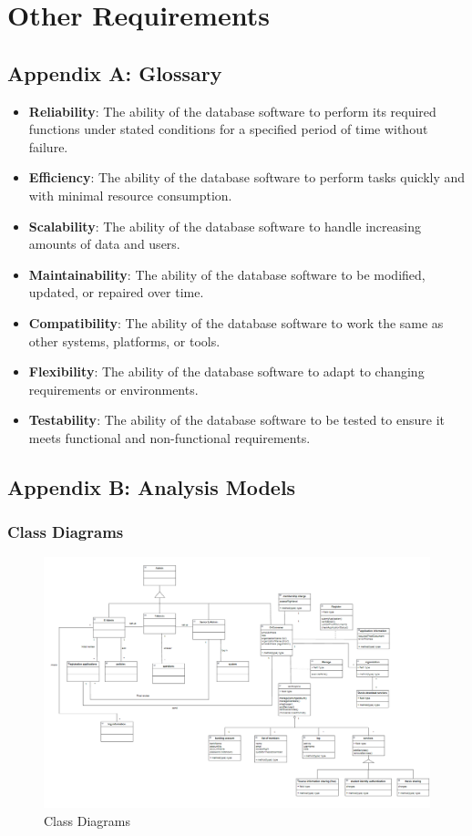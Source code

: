 \chapter{Other Requirements}

\section{Appendix A: Glossary}
\begin{itemize}
    \item \textbf{Reliability}: The ability of the database software to perform its required functions under stated conditions for a specified period of time without failure.
    
    \item \textbf{Efficiency}: The ability of the database software to perform tasks quickly and with minimal resource consumption.
    
    \item \textbf{Scalability}: The ability of the database software to handle increasing amounts of data and users.
    
    \item \textbf{Maintainability}: The ability of the database software to be modified, updated, or repaired over time.
    
    \item \textbf{Compatibility}: The ability of the database software to work the same as other systems, platforms, or tools.
    
    \item \textbf{Flexibility}: The ability of the database software to adapt to changing requirements or environments.
    
    \item \textbf{Testability}: The ability of the database software to be tested to ensure it meets functional and non-functional requirements.
\end{itemize}

\section{Appendix B: Analysis Models}
\subsection{Class Diagrams}
\begin{figure}[H]
    \centering
    \includegraphics[width=0.75\linewidth]{picture/20250318214541.png}
    \caption{Class Diagrams}
    \label{fig:enter-label}
\end{figure}

